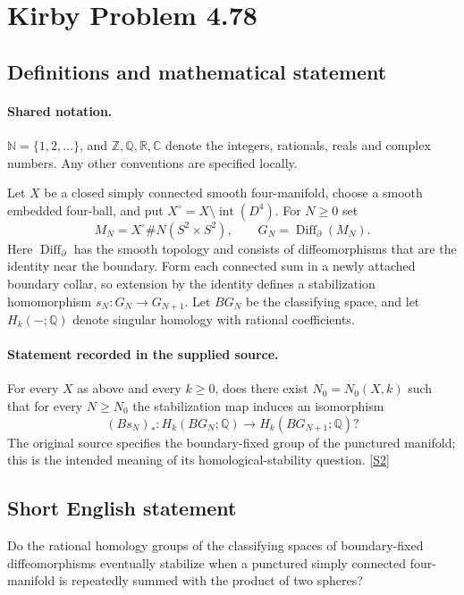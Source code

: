 \documentclass[11pt]{article}
\newcommand{\sref}[2]{\hyperlink{source:#1:#2}{[S#2]}}
\begin{document}
\section{Kirby Problem 4.78}\label{statement}

\subsection{Definitions and mathematical statement}

\paragraph{Shared notation.}$\mathbb N=\{1,2,\ldots\}$, and $\mathbb Z,\mathbb Q,\mathbb R,\mathbb C$ denote the integers, rationals, reals and complex numbers. Any other conventions are specified locally.


Let $X$ be a closed simply connected smooth four-manifold, choose a smooth embedded four-ball, and put $X^{\circ}=X\setminus\operatorname{int}(D^4)$. For $N\ge0$ set
\[
M_N=X^{\circ}\#N(S^2\times S^2),\qquad G_N=\operatorname{Diff}_{\partial}(M_N).
\]
Here $\operatorname{Diff}_{\partial}$ has the smooth topology and consists of diffeomorphisms that are the identity near the boundary. Form each connected sum in a newly attached boundary collar, so extension by the identity defines a stabilization homomorphism $s_N:G_N\to G_{N+1}$. Let $BG_N$ be the classifying space, and let $H_k(-;\mathbb Q)$ denote singular homology with rational coefficients.
\paragraph{Statement recorded in the supplied source.}
For every $X$ as above and every $k\ge0$, does there exist $N_0=N_0(X,k)$ such that for every $N\ge N_0$ the stabilization map induces an isomorphism
\[
(Bs_N)_*:H_k(BG_N;\mathbb Q)\longrightarrow H_k(BG_{N+1};\mathbb Q)?
\]
The original source specifies the boundary-fixed group of the punctured manifold; this is the intended meaning of its homological-stability question. \sref{statement}{2}
\subsection{Short English statement}
Do the rational homology groups of the classifying spaces of boundary-fixed diffeomorphisms eventually stabilize when a punctured simply connected four-manifold is repeatedly summed with the product of two spheres?
\end{document}

